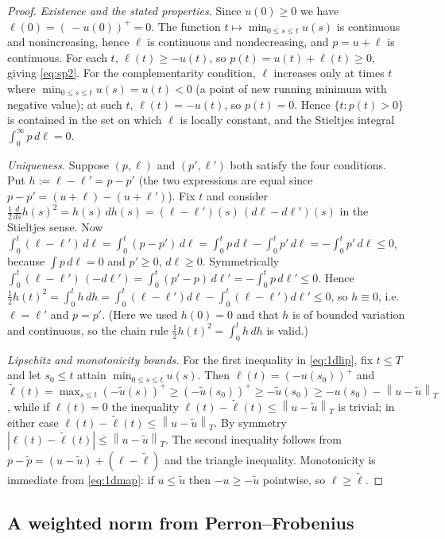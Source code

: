 \documentclass{amsart}
\theoremstyle{definition}
\theoremstyle{remark}
\newcommand{\norm}[1]{\left\lVert#1\right\rVert}
\begin{document}
\begin{proof}
\emph{Existence and the stated properties.} Since $u(0)\ge0$ we have
$\ell(0)=(\,{-}u(0))^+=0$. The function $t\mapsto\min_{0\le s\le t}u(s)$ is
continuous and nonincreasing, hence $\ell$ is continuous and nondecreasing, and
$p=u+\ell$ is continuous. For each $t$, $\ell(t)\ge -u(t)$, so
$p(t)=u(t)+\ell(t)\ge0$, giving \eqref{eq:sp2}. For the complementarity
condition, $\ell$ increases only at times $t$ where
$\min_{0\le s\le t}u(s)=u(t)<0$ (a point of new running minimum with negative
value); at such $t$, $\ell(t)=-u(t)$, so $p(t)=0$. Hence $\{t:p(t)>0\}$ is
contained in the set on which $\ell$ is locally constant, and the Stieltjes
integral $\int_0^\infty p\,d\ell=0$.

\emph{Uniqueness.} Suppose $(p,\ell)$ and $(p',\ell')$ both satisfy the four
conditions. Put $h:=\ell-\ell'=p-p'$ (the two expressions are equal since
$p-p'=(u+\ell)-(u+\ell')$). Fix $t$ and consider
$\tfrac12\frac{d}{ds}h(s)^2=h(s)\,dh(s)=(\ell-\ell')(s)\,(d\ell-d\ell')(s)$ in
the Stieltjes sense. Now
$\int_0^t(\ell-\ell')\,d\ell=\int_0^t(p-p')\,d\ell
=\int_0^t p\,d\ell-\int_0^t p'\,d\ell=-\int_0^t p'\,d\ell\le 0$,
because $\int p\,d\ell=0$ and $p'\ge0$, $d\ell\ge0$. Symmetrically
$\int_0^t(\ell-\ell')\,(-d\ell')=\int_0^t(p'-p)\,d\ell'
=-\int_0^t p\,d\ell'\le0$. Hence
$\tfrac12 h(t)^2=\int_0^t h\,dh
=\int_0^t(\ell-\ell')d\ell-\int_0^t(\ell-\ell')d\ell'\le 0$, so $h\equiv0$,
i.e.\ $\ell=\ell'$ and $p=p'$. (Here we used $h(0)=0$ and that $h$ is of
bounded variation and continuous, so the chain rule
$\tfrac12 h(t)^2=\int_0^t h\,dh$ is valid.)

\emph{Lipschitz and monotonicity bounds.} For the first inequality in
\eqref{eq:1dlip}, fix $t\le T$ and let $s_0\le t$ attain
$\min_{0\le s\le t}u(s)$. Then
$\ell(t)=(-u(s_0))^+$ and
$\tilde\ell(t)=\max_{s\le t}(-\tilde u(s))^+\ge(-\tilde u(s_0))^+
\ge -\tilde u(s_0)\ge -u(s_0)-\norm{u-\tilde u}_T$, while if $\ell(t)=0$ the
inequality $\ell(t)-\tilde\ell(t)\le \norm{u-\tilde u}_T$ is trivial; in either
case $\ell(t)-\tilde\ell(t)\le \norm{u-\tilde u}_T$. By symmetry
$|\ell(t)-\tilde\ell(t)|\le\norm{u-\tilde u}_T$. The second inequality follows
from $p-\tilde p=(u-\tilde u)+(\ell-\tilde\ell)$ and the triangle inequality.
Monotonicity is immediate from \eqref{eq:1dmap}: if $u\le\tilde u$ then
$-u\ge-\tilde u$ pointwise, so $\ell\ge\tilde\ell$.
\end{proof}

\subsection{A weighted norm from Perron--Frobenius}
\end{document}
